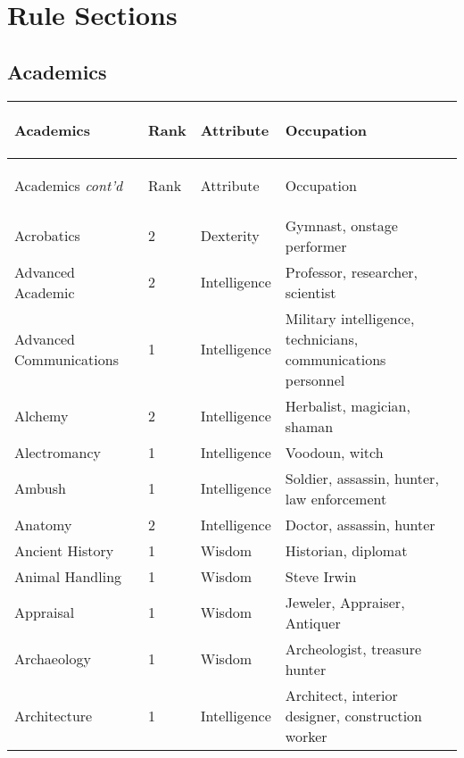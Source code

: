 \documentclass[twoside]{book}
\begin{document}
  
    

\part{Rule Sections}
    
    

\chapter{Academics}
    
\begin{longtable}{p{1.25in}llp{12em}} 
  Academics& \begin{turn}{70}{Rank}\end{turn}
          & \begin{turn}{70}{Attribute}\end{turn}
          & \begin{turn}{70}{Occupation}\end{turn}
          \\
  \hline
  \hline
  \endfirsthead
  Academics \textit{cont'd}
        & \begin{turn}{70}{Rank}\end{turn}
          & \begin{turn}{70}{Attribute}\end{turn}
          & \begin{turn}{70}{Occupation}\end{turn}
           \\
  \hline
  \endhead
\raggedright Acrobatics&2&Dexterity&Gymnast, onstage performer\tabularnewline
      \raggedright Advanced Academic&2&Intelligence&Professor, researcher, scientist\tabularnewline
      \raggedright Advanced Communications&1&Intelligence&Military intelligence, technicians, communications personnel\tabularnewline
      \raggedright Alchemy&2&Intelligence&Herbalist, magician, shaman\tabularnewline
      \raggedright Alectromancy&1&Intelligence&Voodoun, witch\tabularnewline
      \raggedright Ambush&1&Intelligence&Soldier, assassin, hunter, law enforcement\tabularnewline
      \raggedright Anatomy&2&Intelligence&Doctor, assassin, hunter\tabularnewline
      \raggedright Ancient History&1&Wisdom&Historian, diplomat\tabularnewline
      \raggedright Animal Handling&1&Wisdom&Steve Irwin\tabularnewline
      \raggedright Appraisal&1&Wisdom&Jeweler, Appraiser, Antiquer\tabularnewline
      \raggedright Archaeology&1&Wisdom&Archeologist, treasure hunter\tabularnewline
      \raggedright Architecture&1&Intelligence&Architect, interior designer, construction worker\tabularnewline

\end{longtable}
\end{document}
